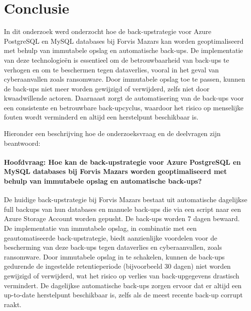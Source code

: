 
\chapter{Conclusie}%
\label{ch:conclusie}

In dit onderzoek werd onderzocht hoe de back-upstrategie voor Azure PostgreSQL en MySQL databases bij Forvis Mazars kan worden geoptimaliseerd met behulp van immutabele opslag en automatische back-ups. De implementatie van deze technologieën is essentieel om de betrouwbaarheid van back-ups te verhogen en om te beschermen tegen dataverlies, vooral in het geval van cyberaanvallen zoals ransomware. Door immutabele opslag toe te passen, kunnen de back-ups niet meer worden gewijzigd of verwijderd, zelfs niet door kwaadwillende actoren. Daarnaast zorgt de automatisering van de back-ups voor een consistente en betrouwbare back-upcyclus, waardoor het risico op menselijke fouten wordt verminderd en altijd een herstelpunt beschikbaar is.

Hieronder een beschrijving hoe de onderzoeksvraag en de deelvragen zijn beantwoord:

\subsubsection{Hoofdvraag: Hoe kan de back-upstrategie voor Azure PostgreSQL en MySQL databases bij Forvis Mazars worden geoptimaliseerd met behulp van immutabele opslag en automatische back-ups?}

De huidige back-upstrategie bij Forvis Mazars bestaat uit automatische dagelijkse full backups van hun databases en manuele back-ups die via een script naar een Azure Storage Account worden gepusht. De back-ups worden 7 dagen bewaard. De implementatie van immutabele opslag, in combinatie met een geautomatiseerde back-upstrategie, biedt aanzienlijke voordelen voor de bescherming van deze back-ups tegen dataverlies en cyberaanvallen, zoals ransomware. Door immutabele opslag in te schakelen, kunnen de back-ups gedurende de ingestelde retentieperiode (bijvoorbeeld 30 dagen) niet worden gewijzigd of verwijderd, wat het risico op verlies van back-upgegevens drastisch vermindert. De dagelijkse automatische back-ups zorgen ervoor dat er altijd een up-to-date herstelpunt beschikbaar is, zelfs als de meest recente back-up corrupt raakt. 

